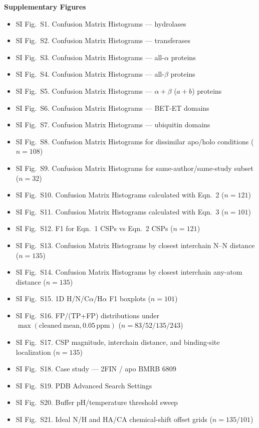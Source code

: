 \documentclass[11pt]{article}
\begin{document}
\vspace{0.6em}
\noindent\textbf{Supplementary Figures}\\[0.3em]
\begin{itemize}[label={}]
\item SI Fig.\ S1. Confusion Matrix Histograms --- hydrolases
\item SI Fig.\ S2. Confusion Matrix Histograms --- transferases
\item SI Fig.\ S3. Confusion Matrix Histograms --- all-$\alpha$ proteins
\item SI Fig.\ S4. Confusion Matrix Histograms --- all-$\beta$ proteins
\item SI Fig.\ S5. Confusion Matrix Histograms --- $\alpha+\beta$ ($a{+}b$) proteins
\item SI Fig.\ S6. Confusion Matrix Histograms --- BET-ET domains
\item SI Fig.\ S7. Confusion Matrix Histograms --- ubiquitin domains
\item SI Fig.\ S8. Confusion Matrix Histograms for dissimilar apo/holo conditions ($n=108$)
\item SI Fig.\ S9. Confusion Matrix Histograms for same-author/same-study subset ($n=32$)
\item SI Fig.\ S10. Confusion Matrix Histograms calculated with Eqn.\ 2 ($n=121$)
\item SI Fig.\ S11. Confusion Matrix Histograms calculated with Eqn.\ 3 ($n=101$)
\item SI Fig.\ S12. F1 for Eqn.\ 1 CSPs vs Eqn.\ 2 CSPs ($n=121$)
\item SI Fig.\ S13. Confusion Matrix Histograms by closest interchain N--N distance ($n=135$)
\item SI Fig.\ S14. Confusion Matrix Histograms by closest interchain any-atom distance ($n=135$)
\item SI Fig.\ S15. 1D H/N/C$\alpha$/H$\alpha$ F1 boxplots ($n=101$)
\item SI Fig.\ S16. FP/(TP+FP) distributions under $\max(\mathrm{cleaned\ mean},0.05\,\mathrm{ppm})$ ($n=83/52/135/243$)
\item SI Fig.\ S17. CSP magnitude, interchain distance, and binding-site localization ($n=135$)
\item SI Fig.\ S18. Case study --- 2FIN / apo BMRB 6809
\item SI Fig.\ S19. PDB Advanced Search Settings
\item SI Fig.\ S20. Buffer pH/temperature threshold sweep
\item SI Fig.\ S21. Ideal N/H and HA/CA chemical-shift offset grids ($n=135/101$)

\end{itemize}
\end{document}
